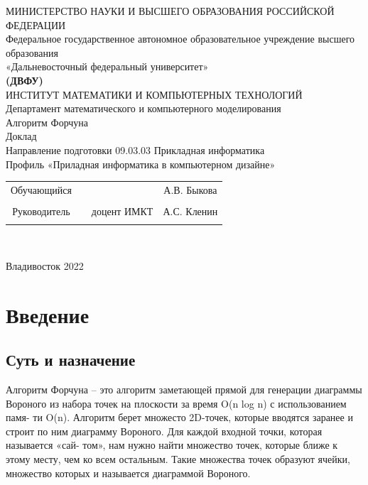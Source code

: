 \documentclass[ a4paper]{article}
\begin{document}
\begin{center}
\hfill \break
\large{МИНИСТЕРСТВО НАУКИ И ВЫСШЕГО ОБРАЗОВАНИЯ РОССИЙСКОЙ ФЕДЕРАЦИИ}\\
\footnotesize{Федеральное государственное автономное образовательное учреждение высшего образования}\\ 
\footnotesize{«Дальневосточный федеральный университет»}\\
\small{\textbf{(ДВФУ)}}\\
\hfill \break
\normalsize{ИНСТИТУТ МАТЕМАТИКИ И КОМПЬЮТЕРНЫХ ТЕХНОЛОГИЙ}\\
 \hfill \break
\normalsize{Департамент математического и компьютерного моделирования}\\
\hfill\break
\hfill \break
\hfill \break
\hfill \break
\large{Алгоритм Форчуна}\\
\hfill \break
\hfill \break
\hfill \break
\normalsize{Доклад\\
\hfill \break
Направление подготовки 09.03.03 Прикладная информатика\\
\hfill \break
Профиль «Приладная информатика в компьютерном дизайне»}\\
\hfill \break
\hfill \break
\end{center}
 
\normalsize{} \hfill \break
\hfill \break
 
\normalsize{ 
\begin{tabular}{cccc}
Обучающийся & \underline{\hspace{3cm}} & &А.В. Быкова \\\\
Руководитель & \underline{\hspace{3cm}}& доцент ИМКТ &А.С. Кленин \\\\
\end{tabular}
}\\
\hfill \break
\hfill \break
\begin{center} Владивосток 2022 \end{center}
\thispagestyle{empty} 
 
\newpage
     
    \tableofcontents 
\newpage

\section{Введение}
\subsection{Суть и назначение}
Алгоритм Форчуна – это алгоритм заметающей прямой для генерации диаграммы
Вороного из набора точек на плоскости за время O(n log n) с использованием памя-
ти O(n). Алгоритм берет множесто 2D-точек, которые вводятся заранее и строит по
ним диаграмму Вороного. Для каждой входной точки, которая называется «сай-
том», нам нужно найти множество точек, которые ближе к этому месту, чем ко
всем остальным. Такие множества точек образуют ячейки, множество которых и
называется диаграммой Вороного.
\end{document}
